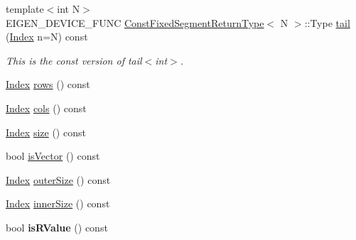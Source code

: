 \begin{DoxyCompactItemize}
\item 
\mbox{\label{class_eigen_1_1_sparse_matrix_base_a8ce8c493f10d35305b96815b97488c6a}} 
{\footnotesize template$<$int N$>$ }\\E\+I\+G\+E\+N\+\_\+\+D\+E\+V\+I\+C\+E\+\_\+\+F\+U\+NC \mbox{\hyperlink{struct_eigen_1_1_sparse_matrix_base_1_1_const_fixed_segment_return_type}{Const\+Fixed\+Segment\+Return\+Type}}$<$ N $>$\+::Type \mbox{\hyperlink{class_eigen_1_1_sparse_matrix_base_a8ce8c493f10d35305b96815b97488c6a}{tail}} (\mbox{\hyperlink{struct_eigen_1_1_eigen_base_a554f30542cc2316add4b1ea0a492ff02}{Index}} n=N) const
\begin{DoxyCompactList}\small\item\em This is the const version of tail$<$int$>$. \end{DoxyCompactList}\item 
\mbox{\hyperlink{struct_eigen_1_1_eigen_base_a554f30542cc2316add4b1ea0a492ff02}{Index}} \mbox{\hyperlink{class_eigen_1_1_sparse_matrix_base_a1944e9fa9ce7937bfc3a87b2cb94371f}{rows}} () const
\item 
\mbox{\hyperlink{struct_eigen_1_1_eigen_base_a554f30542cc2316add4b1ea0a492ff02}{Index}} \mbox{\hyperlink{class_eigen_1_1_sparse_matrix_base_aca7ce296424ef6e478ab0fb19547a7ee}{cols}} () const
\item 
\mbox{\hyperlink{struct_eigen_1_1_eigen_base_a554f30542cc2316add4b1ea0a492ff02}{Index}} \mbox{\hyperlink{class_eigen_1_1_sparse_matrix_base_a124bc57921775eb9aa2dfd9727e23472}{size}} () const
\item 
bool \mbox{\hyperlink{class_eigen_1_1_sparse_matrix_base_a7eedffa867031f649fd0fb9cc23ce4be}{is\+Vector}} () const
\item 
\mbox{\hyperlink{struct_eigen_1_1_eigen_base_a554f30542cc2316add4b1ea0a492ff02}{Index}} \mbox{\hyperlink{class_eigen_1_1_sparse_matrix_base_ac86cc88a4cfef21db6b64ec0ab4c8f0a}{outer\+Size}} () const
\item 
\mbox{\hyperlink{struct_eigen_1_1_eigen_base_a554f30542cc2316add4b1ea0a492ff02}{Index}} \mbox{\hyperlink{class_eigen_1_1_sparse_matrix_base_a180fcba1ccf3cdf3252a263bc1de7a1d}{inner\+Size}} () const
\item 
\mbox{\label{class_eigen_1_1_sparse_matrix_base_a1c648eecf99e2774aa61195f3282b45a}} 
bool {\bfseries is\+R\+Value} () const
\item 
\mbox{\label{class_eigen_1_1_sparse_matrix_base_a8f373317f897c196d6623ab4d29dd454}} 

\end{DoxyCompactItemize}
